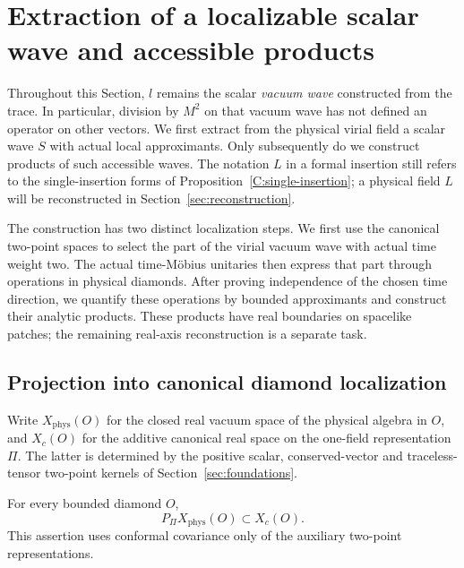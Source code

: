 \section{Extraction of a localizable scalar wave and accessible products}
\label{sec:extraction}

Throughout this Section, $l$ remains the scalar \emph{vacuum wave}
constructed from the trace.  In particular, division by $M^2$ on that
vacuum wave has not defined an operator on other vectors.  We first extract
from the physical virial field a scalar wave $S$ with actual local
approximants.  Only subsequently do we construct products of such accessible
waves.  The notation $L$ in a formal insertion still refers to the
single-insertion forms of Proposition~\ref{C:single-insertion}; a physical field
$L$ will be reconstructed in Section~\ref{sec:reconstruction}.

The construction has two distinct localization steps.  We first use
the canonical two-point spaces to select the part of the virial vacuum
wave with actual time weight two.  The actual time-M\"obius unitaries
then express that part through operations in physical diamonds.  After
proving independence of the chosen time direction, we quantify these
operations by bounded approximants and construct their analytic
products.  These products have real boundaries on spacelike patches;
the remaining real-axis reconstruction is a separate task.

\subsection{Projection into canonical diamond localization}

Write $X_{\mathrm{phys}}(O)$ for the closed real vacuum space of the
physical algebra in $O$, and $X_c(O)$ for the additive canonical real
space on the one-field representation $\Pi$.  The latter is determined by
the positive scalar, conserved-vector and traceless-tensor two-point
kernels of Section~\ref{sec:foundations}.

\begin{lemma}\label{E:projection-localization}
For every bounded diamond $O$,
\begin{equation}\label{E:diamond-projection}
 P_\Pi X_{\mathrm{phys}}(O)\subset X_c(O).
\end{equation}
This assertion uses conformal covariance only of the auxiliary two-point
representations.
\end{lemma}

